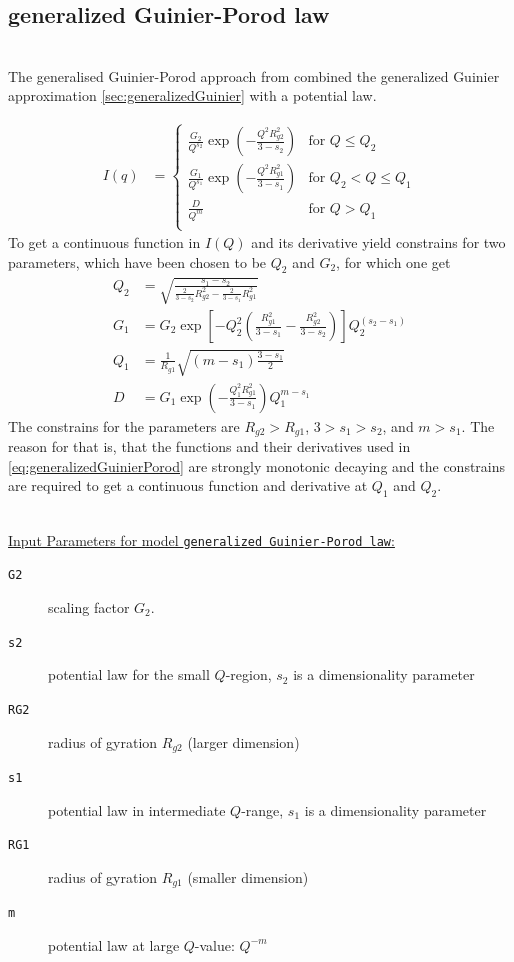 \clearpage
\subsection{generalized Guinier-Porod law}
\label{sec:generalizedGuinierPorodLaw}  ~\\

The generalised Guinier-Porod approach from \cite{Hammouda2010} combined the  generalized Guinier approximation \ref{sec:generalizedGuinier} with a potential law.

\begin{align}
I(q) &=
\begin{cases}
  \frac{G_2}{Q^{s_2}} \exp\left(-\frac{Q^2R^2_{g2}}{3-s_2}\right)& \mbox{for } Q \leq Q_2\\
  \frac{G_1}{Q^{s_1}} \exp\left(-\frac{Q^2R^2_{g1}}{3-s_1}\right)& \mbox{for } Q_2 < Q\leq Q_1\\
  \frac{D}{Q^m} & \mbox{for } Q > Q_1 \\
\end{cases}
\label{eq:generalizedGuinierPorod}
\end{align}
To get a continuous function in $I(Q)$ and its derivative yield constrains for two parameters, which have been chosen to be $Q_2$ and $G_2$, for which one get
\begin{align}
Q_2 &= \sqrt{\frac{s_1-s_2}{\frac{2}{3-s_2}R^2_{g2}-\frac{2}{3-s_1}R^2_{g1}}}\\
G_1 &= G_2 \exp\left[-Q_2^2\left(\frac{R^2_{g1}}{3-s_1}-\frac{R_{g2}^2}{3-s_2}\right)\right] Q_2^{(s_2-s_1)} \\
Q_1 &= \frac{1}{R_{g1}}\sqrt{\left(m-s_1\right)\frac{3-s_1}{2}} \\
D   &= G_1 \exp\left(-\frac{Q_1^2 R_{g1}^2}{3-s_1}\right) Q_1^{m-s_1}
\label{eq:generalizedGuinierPorodConstrains}
\end{align}
The constrains for the parameters are $R_{g2}>R_{g1}$, $3>s_1>s_2$, and $m>s_1$. The reason for that is, that the functions and their derivatives used in \ref{eq:generalizedGuinierPorod} are strongly monotonic decaying and the constrains are required to get a continuous function and derivative at $Q_1$ and $Q_2$.

\hspace{1pt}\\
\uline{Input Parameters for model \texttt{generalized Guinier-Porod law}:}\\
\begin{description}
\item[\texttt{G2}] scaling factor $G_2$.
\item[\texttt{s2}] potential law for the small $Q$-region, $s_2$ is a dimensionality parameter
\item[\texttt{RG2}] radius of gyration $R_{g2}$ (larger dimension)
\item[\texttt{s1}] potential law in intermediate $Q$-range, $s_1$ is a dimensionality parameter
\item[\texttt{RG1}] radius of gyration $R_{g1}$ (smaller dimension)
\item[\texttt{m}] potential law at large $Q$-value: $Q^{-m}$
\end{description}

